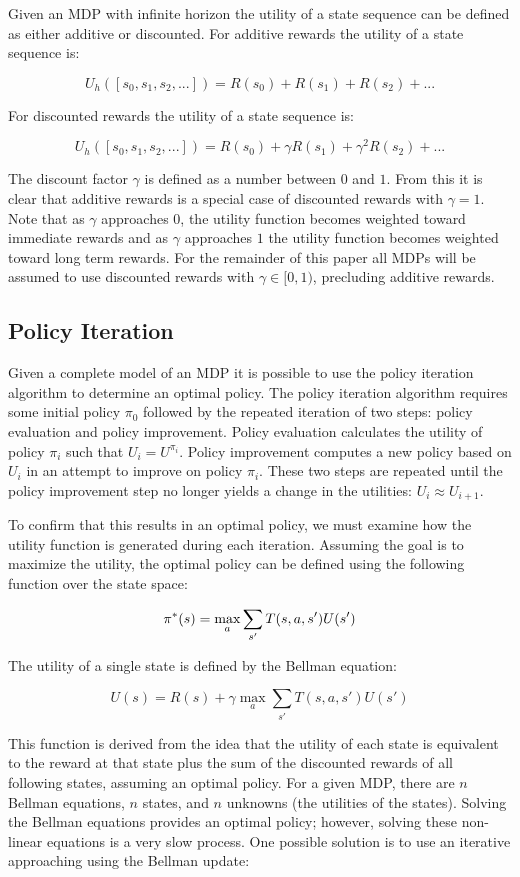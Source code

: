 Given an MDP with infinite horizon the utility of a state sequence can be defined as either additive or discounted. For additive rewards the utility of a state sequence is:

\[
		U_h([s_0,s_1,s_2,...]) = R(s_0) + R(s_1) + R(s_2) + ...
\]

For discounted rewards the utility of a state sequence is:

\[
		U_h([s_0,s_1,s_2,...]) = R(s_0) + \gamma R(s_1) + \gamma^2 R(s_2) + ...
\]

The discount factor $\gamma$ is defined as a number between $0$ and $1$. From this it is clear that additive rewards is a special case of discounted rewards with $\gamma = 1$.  Note that as $\gamma$ approaches $0$, the utility function becomes weighted toward immediate rewards and as $\gamma$ approaches $1$ the utility function becomes weighted toward long term rewards. For the remainder of this paper all MDPs will be assumed to use discounted rewards with $\gamma \in [0, 1)$, precluding additive rewards.

\subsection{Policy Iteration}

Given a complete model of an MDP it is possible to use the policy iteration algorithm to determine an optimal policy. The policy iteration algorithm requires some initial policy $\pi_0$ followed by the repeated iteration of two steps: policy evaluation and policy improvement. Policy evaluation calculates the utility of policy $\pi_i$ such that $U_i = U^{\pi_i}$. Policy improvement computes a new policy based on $U_i$ in an attempt to improve on policy $\pi_i$. These two steps are repeated until the policy improvement step no longer yields a change in the utilities: $U_i \approx U_{i+1}$. 

To confirm that this results in an optimal policy, we must examine how the utility function is generated during each iteration. Assuming the goal is to maximize the utility, the optimal policy can be defined using the following function over the state space:

\[
		\pi^*(s) = \operatorname*{max}_a \sum_{s'} T(s,a,s')U(s')
\]

The utility of a single state is defined by the Bellman equation:

\[
		U(s) = R(s) + \gamma \max_a \sum_{s'}T(s,a,s')U(s')
\]

This function is derived from the idea that the utility of each state is equivalent to the reward at that state plus the sum of the discounted rewards of all following states, assuming an optimal policy. For a given MDP, there are $n$ Bellman equations, $n$ states, and $n$ unknowns (the utilities of the states). Solving the Bellman equations provides an optimal policy; however, solving these non-linear equations is a very slow process. One possible solution is to use an iterative approaching using the Bellman update:

